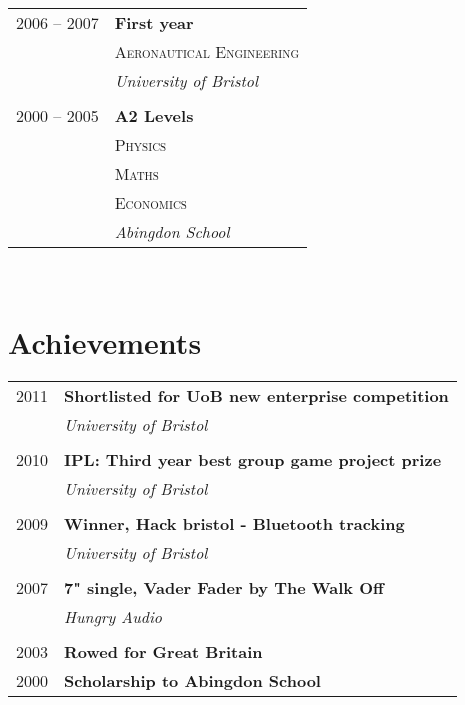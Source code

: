 \documentclass[10pt]{article} %
\begin{document}
{\begin{minipage}[t]{0.44\textwidth}
\begin{tabular}{rl}
2006 -- 2007 & \textbf{First year}\\
& \textsc{Aeronautical Engineering} \\
& \textit{University of Bristol}\\
&\\

2000 -- 2005 & \textbf{A2 Levels}\\
& \textsc{Physics} \\
& \textsc{Maths} \\
& \textsc{Economics} \\
& \textit{Abingdon School} 
	

\end{tabular}\\[10pt]


\section{Achievements}

\begin{tabular}{rl}
2011	 & \textbf{Shortlisted for UoB new enterprise competition}\\
& \textit{University of Bristol}\\ \\

2010	 & \textbf{IPL: Third year best group game project prize}\\
& \textit{University of Bristol}\\ \\

2009	 & \textbf{Winner, Hack bristol - Bluetooth tracking}\\
& \textit{University of Bristol}\\ \\

2007	 & \textbf{7" single, Vader Fader by The Walk Off}\\
& \textit{Hungry Audio}\\ \\

2003	 & \textbf{Rowed for Great Britain}\\

2000     & \textbf{Scholarship to Abingdon School}


\end{tabular}
\end{minipage}}
\end{document}
